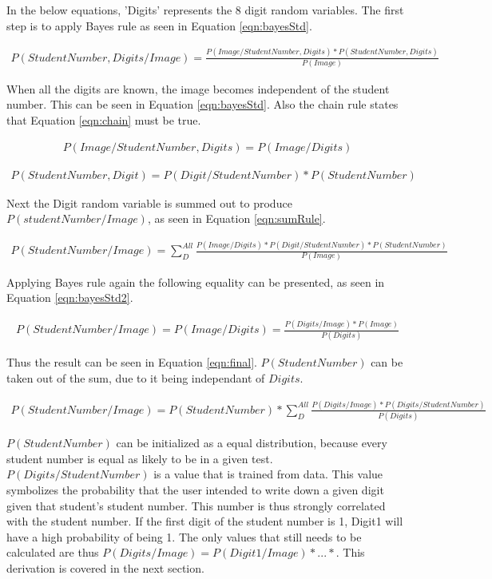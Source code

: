 In the below equations, 'Digits' represents the 8 digit random variables. The first step is to apply Bayes rule as seen in Equation \ref{eqn:bayesStd}.

\begin{align}
  P(StudentNumber,Digits/Image) =  \frac{P(Image/StudentNumber,Digits)*P(StudentNumber,Digits)}{P(Image)}
\label{eqn:bayesStd}
\end{align}

When all the digits are known, the image becomes independent of the student number. This can be seen in Equation \ref{eqn:bayesStd}. Also the chain rule states that Equation \ref{eqn:chain} must be true.

\begin{align}
  P(Image/StudentNumber,Digits) = P(Image/Digits)
\label{eqn:digitInd}
\end{align}

\begin{align}
  P(StudentNumber,Digit) = P(Digit/StudentNumber)*P(StudentNumber)
\label{eqn:chain}
\end{align}

Next the Digit random variable is summed out to produce $P(studentNumber/Image)$, as seen in Equation \ref{eqn:sumRule}.

\begin{align}
  P(StudentNumber/Image) = \sum_{D}^{All} \frac{P(Image/Digits)*P(Digit/StudentNumber)
  *P(StudentNumber)}{P(Image)}
\label{eqn:sumRule}
\end{align}

Applying Bayes rule again the following equality can be presented, as seen in Equation \ref{eqn:bayesStd2}.

\begin{align}
  P(StudentNumber/Image) = P(Image/Digits) = \frac{P(Digits/Image)*P(Image)}{P(Digits)}
\label{eqn:bayesStd2}
\end{align}

Thus the result can be seen in Equation \ref{eqn:final}. $P(StudentNumber)$ can be taken out of the sum, due to it being independant of $Digits$.

\begin{align}
  P(StudentNumber/Image) = P(StudentNumber)*\sum_{D}^{All} \frac{P(Digits/Image)
  *P(Digits/StudentNumber)}{P(Digits)}
\label{eqn:final}
\end{align}

$P(StudentNumber)$ can be initialized as a equal distribution, because every student number is equal as likely to be in a given test. $P(Digits/StudentNumber)$ is a value that is trained from data. This value symbolizes the probability that the user intended to write down a given digit given that student's student number. This number is thus strongly correlated with the student number. If the first digit of the student number is 1, Digit1 will have a high probability of being 1. The only values that still needs to be calculated are thus $P(Digits/Image) = P(Digit1/Image)*...*$. This derivation is covered in the next section.

